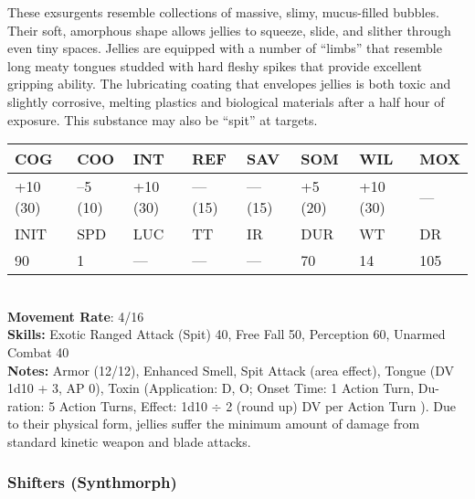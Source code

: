 These exsurgents resemble collections of massive, slimy, 
mucus-filled bubbles. Their soft, amorphous shape 
allows jellies to squeeze, slide, and slither through 
even tiny spaces. Jellies are equipped with a number 
of ``limbs'' that resemble long meaty tongues studded 
with hard fleshy spikes that provide excellent gripping 
ability. The lubricating coating that envelopes jellies is 
both toxic and slightly corrosive, melting plastics and 
biological materials after a half hour of exposure. This 
substance may also be ``spit'' at targets.\\
\begin{tabular}{|l|l|l|l|l|l|l|l|}
\hline
COG & COO & INT & REF & SAV & SOM & WIL & MOX \\
\hline
+10 (30) &  –5 (10) &  +10 (30) &  — (15) &  — (15) &  +5 (20) &  +10 (30) &  — \\
\hline
INIT & SPD & LUC & TT & IR & DUR & WT & DR \\
\hline
90 & 1 & — & — & — & 70 & 14 & 105 \\
\hline
\end{tabular}
\\
\textbf{Movement Rate}: 4/16
\\
\textbf{Skills:} Exotic Ranged Attack (Spit) 40, Free Fall 50, Perception 60, Unarmed Combat 40
\\
\textbf{Notes:} Armor (12/12), Enhanced Smell, Spit Attack (area effect), Tongue (DV 1d10 + 3, AP 0), Toxin (Application: D, O; Onset Time: 1 Action Turn, Du- ration: 5 Action Turns, Effect: 1d10 $\div$ 2 (round up) DV per Action Turn ). Due to their physical form, jellies suffer the minimum amount of damage from standard kinetic weapon and blade attacks. 

\subsubsection{Shifters (Synthmorph)}

